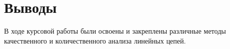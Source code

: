 \section{Выводы}

В ходе курсовой работы были освоены и закреплены 
различные методы качественного и 
количественного анализа линейных цепей.